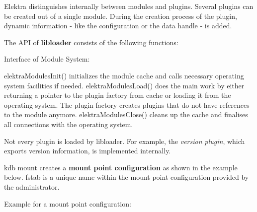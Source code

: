 Elektra distinguishes internally between modules and plugins. Several plugins can be created out of a single module. During the creation process of the plugin, dynamic information -\/ like the configuration or the data handle -\/ is added.

The A\+PI of {\bfseries{libloader}} consists of the following functions\+:

Interface of Module System\+:


\begin{DoxyCode}{0}
\end{DoxyCode}


{\ttfamily elektra\+Modules\+Init()} initializes the module cache and calls necessary operating system facilities if needed. {\ttfamily elektra\+Modules\+Load()} does the main work by either returning a pointer to the plugin factory from cache or loading it from the operating system. The plugin factory creates plugins that do not have references to the module anymore. {\ttfamily elektra\+Modules\+Close()} cleans up the cache and finalises all connections with the operating system.

Not every plugin is loaded by {\ttfamily libloader}. For example, the {\itshape version plugin}, which exports version information, is implemented internally.

{\ttfamily kdb mount} creates a {\bfseries{mount point configuration}} as shown in the example below. {\ttfamily fstab} is a unique name within the mount point configuration provided by the administrator.

Example for a mount point configuration\+:


